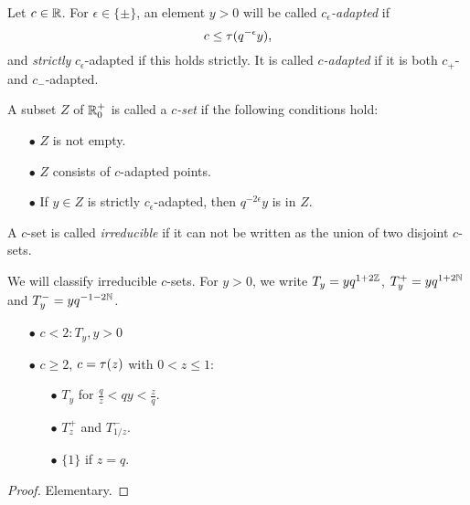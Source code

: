 \begin{Def}\label{DefAdapt} Let $c\in\mathbb{R}$. For $\epsilon \in \{\pm\}$, an element $y>0$ will be called \emph{$c_{\epsilon}$-adapted} if \begin{equation}\label{EqAd+} c \leq \operatorname{\tau}(q^{-\epsilon}y),\end{equation} and \emph{strictly} $c_{\epsilon}$-adapted if this holds strictly. It is called \emph{$c$-adapted} if it is both $c_+$- and $c_-$-adapted. 

A subset $Z$ of $\mathbb{R}^+_0$ is called a \emph{$c$-set} if the following conditions hold: \begin{itemize} 
\item[$\bullet$] $Z$ is not empty.
\item[$\bullet$] $Z$ consists of $c$-adapted points.
\item[$\bullet$] If $y\in Z$ is strictly $c_{\epsilon}$-adapted, then $q^{-2\epsilon}y$ is in $Z$.
\end{itemize}
A $c$-set is called \emph{irreducible} if it can not be written as the union of two disjoint $c$-sets.
\end{Def}

We will classify irreducible $c$-sets. For $y>0$, we write $T_y = yq^{1+2\mathbb{Z}}$, $T_y^+ = yq^{1+2\mathbb{N}}$ and $T_y^{-} = yq^{-1-2\mathbb{N}}$. 


\begin{Prop}\label{PropClass1D}

\begin{itemize} The following list exhausts all irreducible $c$-sets.
\item[$\bullet$] $c<2: T_y, y>0$
\item[$\bullet$] $c \geq 2$, $c=\operatorname{\tau}(z)$ with $0 < z\leq 1$:
\begin{itemize}
\item[$\bullet$] $T_y$ for $\frac{q}{z}<qy<\frac{z}{q}$.
\item[$\bullet$] $T_{z}^+$ and $T_{1/z}^-$.
\item[$\bullet$] $\{1\}$ if $z=q$.
\end{itemize}
\end{itemize}
\end{Prop} 
\begin{proof} Elementary.
\end{proof} 

